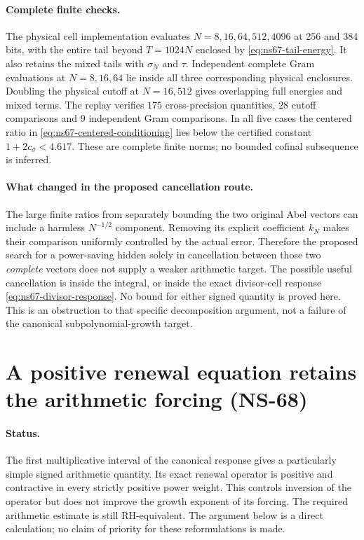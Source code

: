 \paragraph{Complete finite checks.}
The physical cell implementation evaluates $N=8,16,64,512,4096$ at
256 and 384 bits, with the entire tail beyond $T=1024N$ enclosed by
\eqref{eq:ns67-tail-energy}. It also retains the mixed tails with
$\sigma_N$ and $\tau$. Independent complete Gram evaluations at
$N=8,16,64$ lie inside all three corresponding physical enclosures.
Doubling the physical cutoff at $N=16,512$ gives overlapping full
energies and mixed terms. The replay verifies $175$ cross-precision
quantities, $28$ cutoff comparisons and $9$ independent Gram comparisons.
In all five cases the centered ratio in
\eqref{eq:ns67-centered-conditioning} lies below the certified
constant $1+2c_\sigma<4.617$. These are complete finite norms;
no bounded cofinal subsequence is inferred.

\paragraph{What changed in the proposed cancellation route.}
The large finite ratios from separately bounding the two original Abel
vectors can include a harmless $N^{-1/2}$ component. Removing its explicit
coefficient $k_N$ makes their comparison uniformly controlled by the
actual error. Therefore the proposed search for a power-saving hidden
solely in cancellation between those two \emph{complete} vectors does
not supply a weaker arithmetic target. The possible useful cancellation
is inside the integral, or inside the exact divisor-cell response
\eqref{eq:ns67-divisor-response}. No bound for either signed quantity
is proved here. This is an obstruction to that specific decomposition
argument, not a failure of the canonical subpolynomial-growth target.

\section{A positive renewal equation retains the arithmetic forcing (NS-68)}
\label{sec:ns68-renewal}

\paragraph{Status.}
The first multiplicative interval of the canonical response gives a
particularly simple signed arithmetic quantity. Its exact renewal
operator is positive and contractive in every strictly positive power
weight. This controls inversion of the operator but does not improve
the growth exponent of its forcing. The required arithmetic estimate
is still RH-equivalent. The argument below is a direct calculation;
no claim of priority for these reformulations is made.

